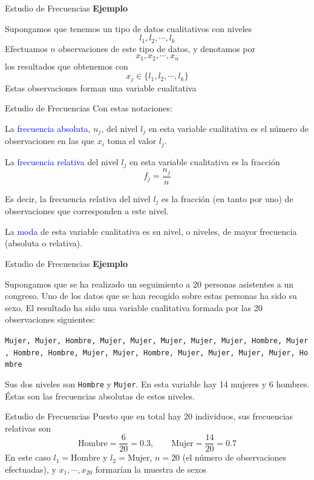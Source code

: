 \documentclass[
  ignorenonframetext,
  aspectratio=169]{beamer}
\newcommand\blue[1]{\textcolor{blue}{#1}}
\begin{document}
\begin{frame}{Estudio de Frecuencias}
\label{estudio-de-frecuencias-1}
\textbf{Ejemplo}

Supongamos que tenemos un tipo de datos cualitativos con niveles
\[l_1,l_2,\cdots,l_k\] Efectuamos \(n\) observaciones de este tipo de
datos, y denotamos por \[x_1,x_2,\cdots,x_n\] los resultados que
obtenemos con \[x_j\in\{l_1, l_2,\cdots, l_k\}\] Estas observaciones
forman una variable cualitativa
\end{frame}

\begin{frame}{Estudio de Frecuencias}
\label{estudio-de-frecuencias-2}
Con estas notaciones:

La \blue{frecuencia absoluta}, \(n_j\), del nivel \(l_j\) en esta
variable cualitativa es el número de observaciones en las que \(x_i\)
toma el valor \(l_j\).

La \blue{frecuencia relativa} del nivel \(l_j\) en esta variable
cualitativa es la fracción \[f_j = \frac{n_j}{n}\]

Es decir, la frecuencia relativa del nivel \(l_j\) es la fracción (en
tanto por uno) de observaciones que corresponden a este nivel.

La \blue{moda} de esta variable cualitativa es su nivel, o niveles, de
mayor frecuencia (absoluta o relativa).
\end{frame}

\begin{frame}[fragile]{Estudio de Frecuencias}
\label{estudio-de-frecuencias-3}
\textbf{Ejemplo}

Supongamos que se ha realizado un seguimiento a 20 personas asistentes a
un congreso. Uno de los datos que se han recogido sobre estas personas
ha sido su sexo. El resultado ha sido una variable cualitativa formada
por las 20 observaciones siguientes:

\texttt{Mujer,\ Mujer,\ Hombre,\ Mujer,\ Mujer,\ Mujer,\ Mujer,\ Mujer,\ Hombre,\ Mujer,\ Hombre,\ Hombre,\ Mujer,\ Mujer,\ Hombre,\ Mujer,\ Mujer,\ Mujer,\ Mujer,\ Hombre}

Sus dos niveles son \texttt{Hombre} y \texttt{Mujer}. En esta variable
hay 14 mujeres y 6 hombres. Éstas son las frecuencias absolutas de estos
niveles.
\end{frame}

\begin{frame}{Estudio de Frecuencias}
\label{estudio-de-frecuencias-4}
Puesto que en total hay 20 individuos, sus frecuencias relativas son
\[\text{Hombre} = \frac{6}{20} = 0.3,\qquad \text{Mujer} = \frac{14}{20} = 0.7\]
En este caso \(l_1 = \text{Hombre}\) y \(l_2 = \text{Mujer}\),
\(n = 20\) (el número de observaciones efectuadas), y
\(x_1,\cdots, x_{20}\) formarían la muestra de sexos
\end{frame}
\end{document}
